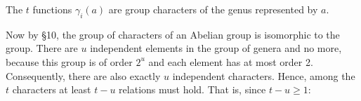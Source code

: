 The $t$ functions $\gamma_i(a)$ are group characters of the genus represented by $a$.

Now by §10, the group of characters of an Abelian group is isomorphic to the group. There are $u$ independent elements in the group of genera and no more, because this group is of order $2^u$ and each element has at most order 2. Consequently, there are also exactly $u$ independent characters. Hence, among the $t$ characters at least $t - u$ relations must hold. That is, since $t - u \geq 1$:
